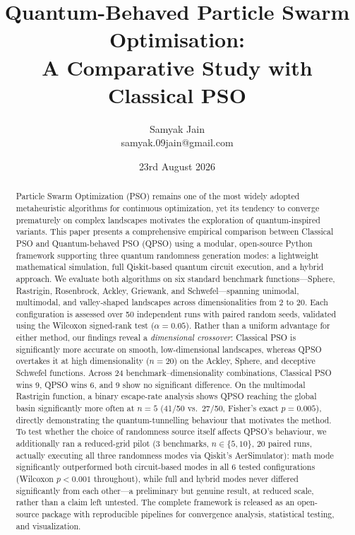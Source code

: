 \documentclass[11pt]{article}
\title{\textbf{Quantum-Behaved Particle Swarm Optimisation:\\
A Comparative Study with Classical PSO}}
\author{Samyak Jain\\[2pt] \small samyak.09jain@gmail.com}
\date{\small 23rd August 2026}
\begin{document}
\maketitle

\begin{abstract}
\noindent Particle Swarm Optimization (PSO) remains one of the most widely adopted metaheuristic algorithms for continuous optimization, yet its tendency to converge prematurely on complex landscapes motivates the exploration of quantum-inspired variants. This paper presents a comprehensive empirical comparison between Classical PSO and Quantum-behaved PSO (QPSO) using a modular, open-source Python framework supporting three quantum randomness generation modes: a lightweight mathematical simulation, full Qiskit-based quantum circuit execution, and a hybrid approach. We evaluate both algorithms on six standard benchmark functions---Sphere, Rastrigin, Rosenbrock, Ackley, Griewank, and Schwefel---spanning unimodal, multimodal, and valley-shaped landscapes across dimensionalities from 2 to 20. Each configuration is assessed over 50 independent runs with paired random seeds, validated using the Wilcoxon signed-rank test ($\alpha=0.05$). Rather than a uniform advantage for either method, our findings reveal a \emph{dimensional crossover}: Classical PSO is significantly more accurate on smooth, low-dimensional landscapes, whereas QPSO overtakes it at high dimensionality ($n=20$) on the Ackley, Sphere, and deceptive Schwefel functions. Across 24 benchmark--dimensionality combinations, Classical PSO wins 9, QPSO wins 6, and 9 show no significant difference. On the multimodal Rastrigin function, a binary escape-rate analysis shows QPSO reaching the global basin significantly more often at $n=5$ (41/50 vs.\ 27/50, Fisher's exact $p=0.005$), directly demonstrating the quantum-tunnelling behaviour that motivates the method. To test whether the choice of randomness source itself affects QPSO's behaviour, we additionally ran a reduced-grid pilot (3 benchmarks, $n\in\{5,10\}$, 20 paired runs, actually executing all three randomness modes via Qiskit's AerSimulator): math mode significantly outperformed both circuit-based modes in all 6 tested configurations (Wilcoxon $p<0.001$ throughout), while full and hybrid modes never differed significantly from each other---a preliminary but genuine result, at reduced scale, rather than a claim left untested. The complete framework is released as an open-source package with reproducible pipelines for convergence analysis, statistical testing, and visualization.
\end{abstract}
\end{document}
